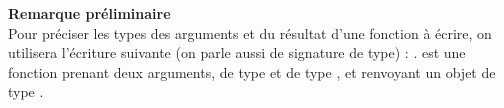 
\vspace{-3cm}

\textbf{Remarque préliminaire} \\
Pour préciser les types des arguments et du résultat d’une fonction à écrire, on utilisera l’écriture suivante (on parle aussi de signature de type) :
.  est une fonction prenant deux arguments,  de
type  et  de type , et renvoyant un objet de type .
